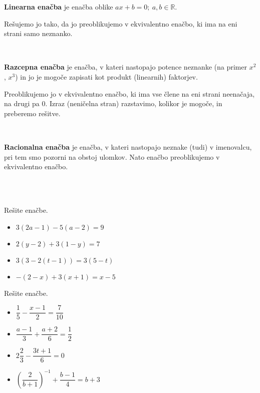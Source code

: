                 \textbf{Linearna enačba} je enačba oblike $ax+b=0;~a,b\in\mathbb{R}$.

                Rešujemo jo tako, da jo preoblikujemo v ekvivalentno enačbo, ki ima na eni strani samo neznanko.
            
~~

                \textbf{Razcepna enačba} je enačba, v kateri nastopajo potence neznanke (na primer $x^2$, $x^3$) in jo je mogoče zapisati kot produkt (linearnih) faktorjev.

                Preoblikujemo jo v ekvivalentno enačbo, ki ima vse člene na eni strani neenačaja, na drugi pa $0$. 
                Izraz (neničelna stran) razstavimo, kolikor je mogoče, in preberemo rešitve.
            
~~

                \textbf{Racionalna enačba} je enačba, v kateri nastopajo neznake (tudi) v imenovalcu, pri tem smo pozorni na obstoj ulomkov. 
                Nato enačbo preoblikujemo v ekvivalentno enačbo.
            

        ~~\\~~\\




        
            \begin{naloga}
                Rešite enačbe.
                \begin{itemize}
                        \item $3(2a-1)-5(a-2)=9$ 
                        \item $2(y-2)+3(1-y)=7$ 
                        \item $3(3-2(t-1))=3(5-t)$ 
                        \item $-(2-x)+3(x+1)=x-5$ 
                \end{itemize}
            \end{naloga}
        


        
            \begin{naloga}
                Rešite enačbe.
                \begin{itemize}
                        \item $\dfrac{1}{5}-\dfrac{x-1}{2}=\dfrac{7}{10}$ 
                        \item $\dfrac{a-1}{3}+\dfrac{a+2}{6}=\dfrac{1}{2}$ 
                        \item $2\dfrac{2}{3}-\dfrac{3t+1}{6}=0$ 
                        \item $\left(\dfrac{2}{b+1}\right)^{-1}+\dfrac{b-1}{4}=b+3$ 
                \end{itemize}
            \end{naloga}
        



